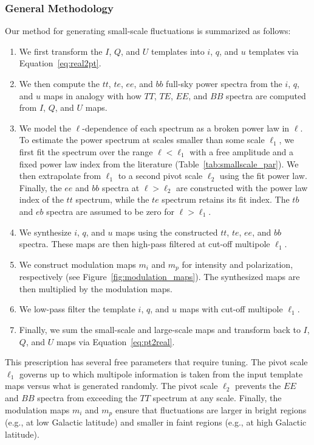 \documentclass[twocolumn]{aastex631}
\begin{document}
\subsubsection{General Methodology}\label{subsec:methodology}
Our method for generating small-scale fluctuations is summarized as follows: 
\begin{enumerate}
    \item We first transform the $I$, $Q$, and $U$ templates into $i$, $q$, and $u$ templates via Equation~\eqref{eq:real2pt}.
    \item We then compute the $tt$, $te$, $ee$, and $bb$ full-sky power spectra from the $i$, $q$, and $u$ maps in analogy with how $TT$, $TE$, $EE$, and $BB$ spectra are computed from $I$, $Q$, and $U$ maps.
    \item We model the $\ell$-dependence of each spectrum as a broken power law in $\ell$. To estimate the power spectrum at scales smaller than some scale $\ell_1$, we first fit the spectrum over the range $\ell < \ell_1$ with a free amplitude and a fixed power law index from the literature (Table~\ref{tab:smallscale_par}). We then extrapolate from $\ell_1$ to a second pivot scale $\ell_2$ using the fit power law. Finally, the $ee$ and $bb$ spectra at $\ell > \ell_2$ are constructed with the power law index of the $tt$ spectrum, while the $te$ spectrum retains its fit index. The $tb$ and $eb$ spectra are assumed to be zero for $\ell > \ell_1$.
    \item  We synthesize $i$, $q$, and $u$ maps using the constructed $tt$, $te$, $ee$, and $bb$ spectra. These maps are then high-pass filtered at cut-off multipole $\ell_1$.
    \item We construct modulation maps $m_i$ and $m_p$ for intensity and polarization, respectively (see Figure~\ref{fig:modulation_maps}). The synthesized maps are then multiplied by the modulation maps.
    \item We low-pass filter the template $i$, $q$, and $u$ maps with cut-off multipole $\ell_1$.
    \item Finally, we sum the small-scale and large-scale maps and transform back to $I$, $Q$, and $U$ maps via Equation~\eqref{eq:pt2real}.
\end{enumerate}

This prescription has several free parameters that require tuning. The pivot scale $\ell_1$ governs up to which multipole information is taken from the input template maps versus what is generated randomly. The pivot scale $\ell_2$ prevents the $EE$ and $BB$ spectra from exceeding the $TT$ spectrum at any scale. Finally, the modulation maps $m_i$ and $m_p$ ensure that fluctuations are larger in bright regions (e.g., at low Galactic latitude) and smaller in faint regions (e.g., at high Galactic latitude).
\end{document}
